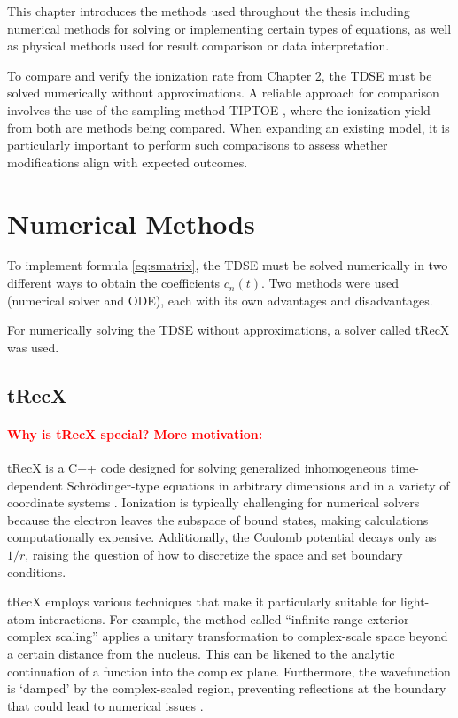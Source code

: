 This chapter introduces the methods used throughout the thesis including numerical methods for solving or implementing certain types of equations, as well as physical methods used for result comparison or data interpretation.


To compare and verify the ionization rate from Chapter 2, the TDSE must be solved numerically without approximations.
A reliable approach for comparison involves the use of the sampling method TIPTOE \cite{Park:18}, where the ionization yield from both are methods being compared.
When expanding an existing model, it is particularly important to perform such comparisons to assess whether modifications align with expected outcomes.

\section{Numerical Methods}
To implement formula \ref{eq:smatrix}, the TDSE must be solved numerically in two different ways to obtain the coefficients $c_n(t)$.  
Two methods were used (numerical solver and ODE), each with its own advantages and disadvantages.  

For numerically solving the TDSE without approximations, a solver called tRecX was used.  


\subsection{tRecX}
\paragraph{\textcolor{red}{Why is tRecX special? More motivation:}}
tRecX is a C++ code designed for solving generalized inhomogeneous time-dependent Schrödinger-type equations in arbitrary dimensions and in a variety of coordinate systems \cite{Scrinzi_trecx}.
Ionization is typically challenging for numerical solvers because the electron leaves the subspace of bound states, making calculations computationally expensive.
Additionally, the Coulomb potential decays only as $1/r$, raising the question of how to discretize the space and set boundary conditions.

tRecX employs various techniques that make it particularly suitable for light-atom interactions.
For example, the method called ``infinite-range exterior complex scaling'' applies a unitary transformation to complex-scale space beyond a certain distance from the nucleus.
This can be likened to the analytic continuation of a function into the complex plane.
Furthermore, the wavefunction is `damped' by the complex-scaled region, preventing reflections at the boundary that could lead to numerical issues \cite{scrinzi_irecs}.

